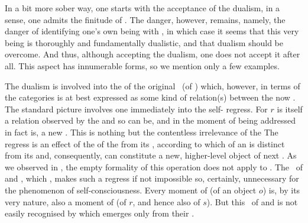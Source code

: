 \pa\label{pa:equrel} In a bit more sober way, one starts with the acceptance of
the  dualism, in a sense, one admits the finitude of
. The danger, however, remains, namely, the danger of identifying
one's own being with , in which case it seems that this very
being is thoroughly and fundamentally dualistic, and that dualism should be
overcome. And thus, although accepting the  dualism, one does not
accept it after all. This aspect has innumerable forms, so we mention only a few
examples.

%
The dualism is involved into the  of the original
\nexus\ (of ) which, however, in terms of the
 categories is at best expressed as some kind of relation(s)
between the now . The standard picture
%
%
involves one immediately into the self- regress. For $r$ is
itself a relation observed by the  and so can be, and in the moment
of being addressed in fact is, a new . This is nothing but the
contentless irrelevance of the 
%
The regress is an effect of the  of the 
from its , according to which  of an  
is distinct from its  and, consequently, can constitute a new,
higher-level object of next . As we observed in
, the empty formality of this operation does not apply 
to . 
The \equin\ of  and , which 
, makes such a regress if not impossible so, certainly,
unnecessary for the phenomenon of self-consciousness. Every moment of
 (of an object $o$) is, by its very nature, also a moment of  (of $r$, and hence also of $s$). But this \equin\ of
 and  is 
not easily recognised by  which emerges only from their
.

